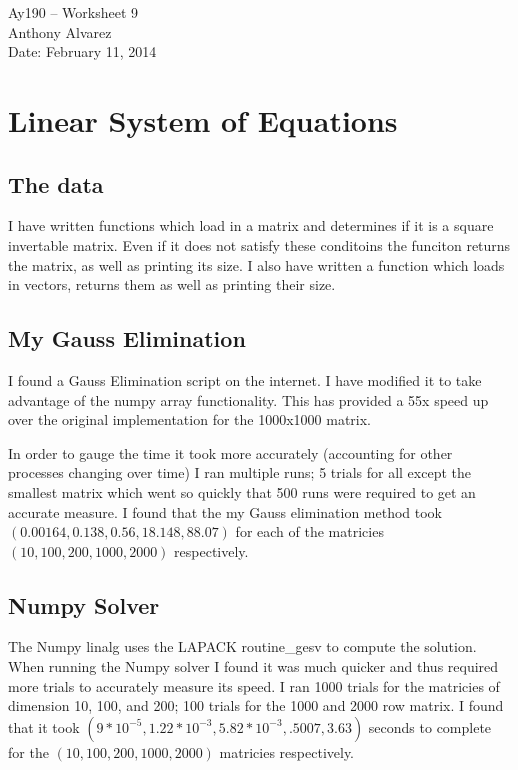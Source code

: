 \documentclass[11pt,letterpaper]{article}
\begin{document}
\begin{center}
\Large
Ay190 -- Worksheet 9\\
Anthony Alvarez\\
Date: February 11, 2014
\end{center}

\section{Linear System of Equations}
\subsection{The data}

I have written functions which load in a matrix and determines if it is a square
invertable matrix. Even if it does not satisfy these conditoins the funciton
returns the matrix, as well as printing its size. I also have written a function
which loads in vectors, returns them as well as printing their size. 

\subsection{My Gauss Elimination}
I found a Gauss Elimination script on the internet. I have modified it to take
advantage of the numpy array functionality. This has provided a 55x speed up 
over the original implementation for the 1000x1000 matrix. 

In order to gauge the time it took more accurately (accounting for other 
processes changing over time) I ran multiple runs; 5 trials for all except the 
smallest matrix which went so quickly that 500 runs were required to get an 
accurate measure. I found that the my Gauss elimination method took 
$(0.00164, 0.138, 0.56, 18.148, 88.07)$ for each of the matricies $(10, 100, 200,
1000,2000)$ respectively. 

\subsection{Numpy Solver}

The Numpy linalg uses the LAPACK routine\_gesv to compute the solution. When
running the Numpy solver I found it was much quicker and thus required more
trials to accurately measure its speed. I ran 1000 trials for the matricies of
dimension 10, 100, and 200; 100 trials for the 1000 and 2000 row matrix. I 
found that it took $(9*10^{-5}, 1.22*10^{-3}, 5.82*10^{-3}, .5007, 3.63)$
seconds to complete for the $(10, 100, 200, 1000,2000)$ matricies respectively. 
\end{document}
